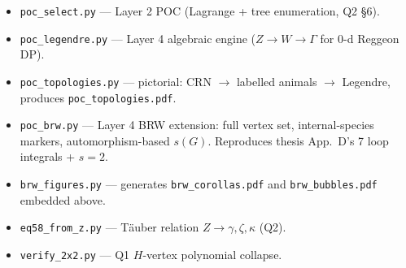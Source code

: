 \documentclass[11pt,a4paper]{article}
\begin{document}
\begin{itemize}[leftmargin=2em,itemsep=1pt]
  \item \texttt{poc\_select.py} --- Layer 2 POC (Lagrange + tree enumeration, Q2 \S6).
  \item \texttt{poc\_legendre.py} --- Layer 4 algebraic engine ($Z\!\to\!W\!\to\!\Gamma$ for 0-d Reggeon DP).
  \item \texttt{poc\_topologies.py} --- pictorial: CRN $\to$ labelled animals $\to$ Legendre, produces \texttt{poc\_topologies.pdf}.
  \item \texttt{poc\_brw.py} --- Layer 4 BRW extension: full vertex set, internal-species markers, automorphism-based $s(G)$. Reproduces thesis App.~D's 7 loop integrals + $s = 2$.
  \item \texttt{brw\_figures.py} --- generates \texttt{brw\_corollas.pdf} and \texttt{brw\_bubbles.pdf} embedded above.
  \item \texttt{eq58\_from\_z.py} --- T\"auber relation $Z\!\to\!\gamma,\zeta,\kappa$ (Q2).
  \item \texttt{verify\_2x2.py} --- Q1 $H$-vertex polynomial collapse.
\end{itemize}
\end{document}
